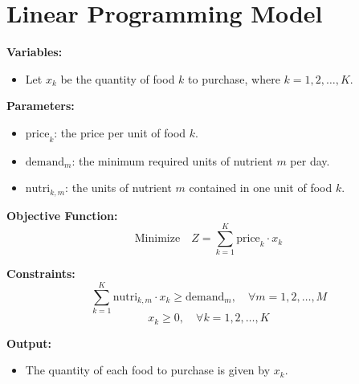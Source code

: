 \documentclass{article}
\begin{document}
\section*{Linear Programming Model}

\textbf{Variables:}
\begin{itemize}
    \item Let \( x_k \) be the quantity of food \( k \) to purchase, where \( k = 1, 2, \ldots, K \).
\end{itemize}

\textbf{Parameters:}
\begin{itemize}
    \item \( \text{price}_k \): the price per unit of food \( k \).
    \item \( \text{demand}_m \): the minimum required units of nutrient \( m \) per day.
    \item \( \text{nutri}_{k,m} \): the units of nutrient \( m \) contained in one unit of food \( k \).
\end{itemize}

\textbf{Objective Function:}
\[
\text{Minimize} \quad Z = \sum_{k=1}^{K} \text{price}_k \cdot x_k
\]

\textbf{Constraints:}
\[
\sum_{k=1}^{K} \text{nutri}_{k,m} \cdot x_k \geq \text{demand}_m, \quad \forall m = 1, 2, \ldots, M
\]
\[
x_k \geq 0, \quad \forall k = 1, 2, \ldots, K
\]

\textbf{Output:}
\begin{itemize}
    \item The quantity of each food to purchase is given by \( x_k \).
\end{itemize}
\end{document}
